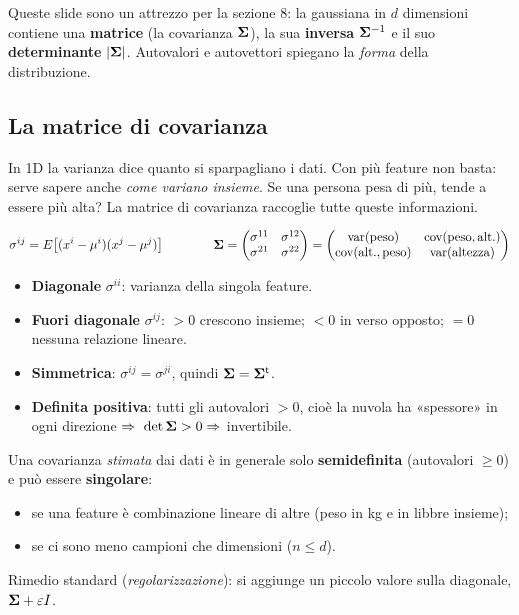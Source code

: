 
Queste slide sono un attrezzo per la sezione 8: la gaussiana in $d$ dimensioni contiene una \textbf{matrice} (la covarianza $\bm{\Sigma}$), la sua \textbf{inversa} $\bm{\Sigma}^{-1}$ e il suo \textbf{determinante} $|\bm{\Sigma}|$. Autovalori e autovettori spiegano la \emph{forma} della distribuzione.

\subsection{La matrice di covarianza}
\begin{intuizione}
In 1D la varianza dice quanto si sparpagliano i dati. Con più feature non basta: serve sapere anche \emph{come variano insieme}. Se una persona pesa di più, tende a essere più alta? La matrice di covarianza raccoglie tutte queste informazioni.
\end{intuizione}
\begin{tecnica}
\[
\sigma^{ij}=E\big[(x^i-\mu^i)(x^j-\mu^j)\big]
\qquad\qquad
\bm{\Sigma}=\begin{pmatrix}\sigma^{11}&\sigma^{12}\\\sigma^{21}&\sigma^{22}\end{pmatrix}=\begin{pmatrix}\mathrm{var(peso)}&\mathrm{cov(peso,alt.)}\\\mathrm{cov(alt.,peso)}&\mathrm{var(altezza)}\end{pmatrix}
\]
\begin{itemize}
  \item \textbf{Diagonale} $\sigma^{ii}$: varianza della singola feature.
  \item \textbf{Fuori diagonale} $\sigma^{ij}$: $>0$ crescono insieme; $<0$ in verso opposto; $=0$ nessuna relazione lineare.
  \item \textbf{Simmetrica}: $\sigma^{ij}=\sigma^{ji}$, quindi $\bm{\Sigma}=\bm{\Sigma}^{\mathsf{t}}$.
  \item \textbf{Definita positiva}: tutti gli autovalori $>0$, cioè la nuvola ha «spessore» in ogni direzione $\Rightarrow\ \det\bm{\Sigma}>0\Rightarrow$ invertibile.
\end{itemize}
\end{tecnica}
\begin{attenzione}
Una covarianza \emph{stimata} dai dati è in generale solo \textbf{semidefinita} (autovalori $\ge0$) e può essere \textbf{singolare}:
\begin{itemize}
  \item se una feature è combinazione lineare di altre (peso in kg e in libbre insieme);
  \item se ci sono meno campioni che dimensioni ($n\le d$).
\end{itemize}
Rimedio standard (\emph{regolarizzazione}): si aggiunge un piccolo valore sulla diagonale, $\bm{\Sigma}+\varepsilon I$.
\end{attenzione}

